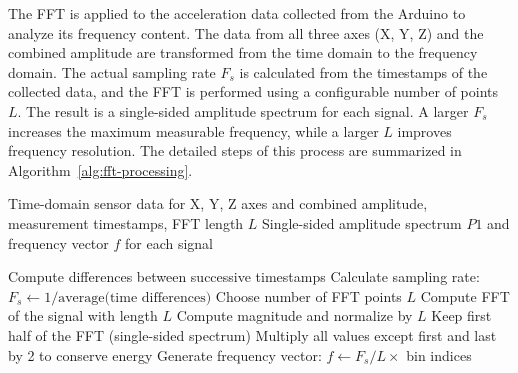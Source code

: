 {	The FFT is applied to the acceleration data collected from the Arduino to analyze its frequency content. The data from all three axes (X, Y, Z) and the combined amplitude are transformed from the time domain to the frequency domain. The actual sampling rate \(F_s\) is calculated from the timestamps of the collected data, and the FFT is performed using a configurable number of points \(L\). The result is a single-sided amplitude spectrum for each signal. A larger \(F_s\) increases the maximum measurable frequency, while a larger \(L\) improves frequency resolution. The detailed steps of this process are summarized in Algorithm~\ref{alg:fft-processing}.
	
	\begin{algorithm}[H]
		\caption{FFT Processing of Arduino Sensor Data}
		\label{alg:fft-processing}
		\begin{algorithmic}[1]
			\REQUIRE Time-domain sensor data for X, Y, Z axes and combined amplitude, measurement timestamps, FFT length $L$
			\ENSURE Single-sided amplitude spectrum $P1$ and frequency vector $f$ for each signal
			
			\STATE Compute differences between successive timestamps
			\STATE Calculate sampling rate: $F_s \gets 1 / \text{average(time differences)}$
			\STATE Choose number of FFT points $L$
			\STATE Compute FFT of the signal with length $L$
			\STATE Compute magnitude and normalize by $L$
			\STATE Keep first half of the FFT (single-sided spectrum)
			\STATE Multiply all values except first and last by 2 to conserve energy
			\STATE Generate frequency vector: $f \gets F_s / L \times$ bin indices
			\ENDFOR
		\end{algorithmic}
	\end{algorithm}
	
	
}  


